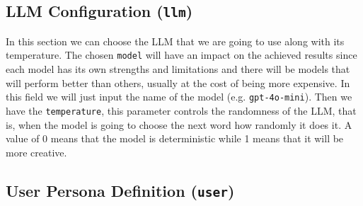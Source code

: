 \subsection{LLM Configuration (\texttt{llm})}

In this section we can choose the \acl{LLM} that we are going to use
along with its temperature.
The chosen \texttt{model} will have an impact on the achieved results
since each model has its own strengths and limitations
and there will be models that will perform better than others,
usually at the cost of being more expensive.
In this field we will just input the name of the model (e.g. \texttt{gpt-4o-mini}).
Then we have the \texttt{temperature},
this parameter controls the randomness of the \ac{LLM},
that is, when the model is going to choose the next word
how randomly it does it.
A value of 0 means that the model is deterministic
while 1 means that it will be more creative.

\subsection{User Persona Definition (\texttt{user})}

